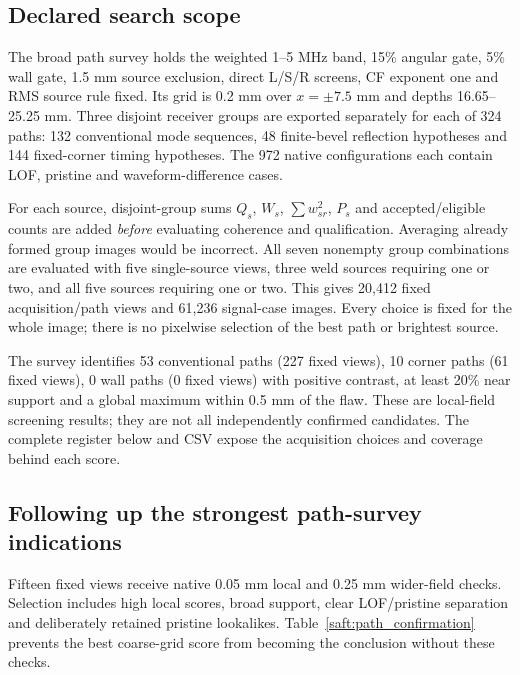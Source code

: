 \documentclass[11pt]{article}
\begin{document}
\subsection{Declared search scope}
The broad path survey holds the weighted 1--5 MHz band, 15\% angular gate, 5\% wall gate, 1.5 mm source exclusion, direct L/S/R screens, CF exponent one and RMS source rule fixed. Its grid is 0.2 mm over $x=\pm7.5$ mm and depths 16.65--25.25 mm. Three disjoint receiver groups are exported separately for each of 324 paths: 132 conventional mode sequences, 48 finite-bevel reflection hypotheses and 144 fixed-corner timing hypotheses. The 972 native configurations each contain LOF, pristine and waveform-difference cases.

For each source, disjoint-group sums $Q_s$, $W_s$, $\sum w_{sr}^2$, $P_s$ and accepted/eligible counts are added \emph{before} evaluating coherence and qualification. Averaging already formed group images would be incorrect. All seven nonempty group combinations are evaluated with five single-source views, three weld sources requiring one or two, and all five sources requiring one or two. This gives 20,412 fixed acquisition/path views and 61,236 signal-case images. Every choice is fixed for the whole image; there is no pixelwise selection of the best path or brightest source.

The survey identifies 53 conventional paths (227 fixed views), 10 corner paths (61 fixed views), 0 wall paths (0 fixed views) with positive contrast, at least 20\% near support and a global maximum within 0.5 mm of the flaw. These are local-field screening results; they are not all independently confirmed candidates. The complete register below and CSV expose the acquisition choices and coverage behind each score.

\subsection{Following up the strongest path-survey indications}
Fifteen fixed views receive native 0.05 mm local and 0.25 mm wider-field checks. Selection includes high local scores, broad support, clear LOF/pristine separation and deliberately retained pristine lookalikes. Table~\ref{saft:path_confirmation} prevents the best coarse-grid score from becoming the conclusion without these checks.
\end{document}

